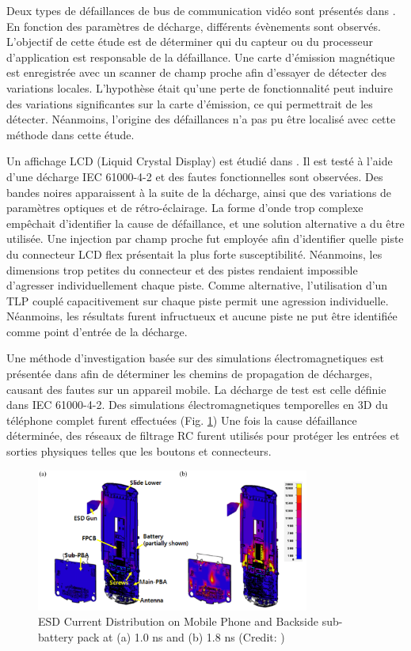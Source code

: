 Deux types de défaillances de bus de communication vidéo sont présentés dans \cite{softFailSubsystem}.
En fonction des paramètres de décharge, différents évènements sont observés.
L'objectif de cette étude est de déterminer qui du capteur ou du processeur d'application est responsable de la défaillance.
Une carte d'émission magnétique est enregistrée avec un scanner de champ proche afin d'essayer de détecter des variations locales.
L'hypothèse était qu'une perte de fonctionnalité peut induire des variations significantes sur la carte d'émission, ce qui permettrait de les détecter.
Néanmoins, l'origine des défaillances n'a pas pu être localisé avec cette méthode dans cette étude.

Un affichage LCD (Liquid Crystal Display) est étudié dans \cite{softFailLCD}.
Il est testé à l'aide d'une décharge IEC 61000-4-2 \cite{iec61000-4-2} et des fautes fonctionnelles sont observées.
Des bandes noires apparaissent à la suite de la décharge, ainsi que des variations de paramètres optiques et de rétro-éclairage.
La forme d'onde trop complexe empêchait d'identifier la cause de défaillance, et une solution alternative a du être utilisée.
Une injection par champ proche fut employée afin d'identifier quelle piste du connecteur LCD flex présentait la plus forte susceptibilité.
Néanmoins, les dimensions trop petites du connecteur et des pistes rendaient impossible d'agresser individuellement chaque piste.
Comme alternative, l'utilisation d'un TLP couplé capacitivement sur chaque piste permit une agression individuelle.
Néanmoins, les résultats furent infructueux et aucune piste ne put être identifiée comme point d'entrée de la décharge.

Une méthode d'investigation basée sur des simulations électromagnetiques est présentée dans \cite{softFailMobile} afin de déterminer les chemins de propagation de décharges, causant des fautes sur un appareil mobile.
La décharge de test est celle définie dans IEC 61000-4-2.
Des simulations électromagnetiques temporelles en 3D du téléphone complet furent effectuées (Fig. \ref{fig:mobile-phone-3d-em})
Une fois la cause défaillance déterminée, des réseaux de filtrage RC furent utilisés pour protéger les entrées et sorties physiques telles que les boutons et connecteurs.

\begin{figure}[!h]
  \centering
  \includegraphics[width=0.8\textwidth]{src/1/figures/current_distribution_mobile.png}
  \caption{ESD Current Distribution on Mobile Phone and Backside sub-battery pack at (a) 1.0 ns and (b) 1.8 ns (Credit: \cite{softFailMobile})}
  \label{fig:mobile-phone-3d-em}
\end{figure}


